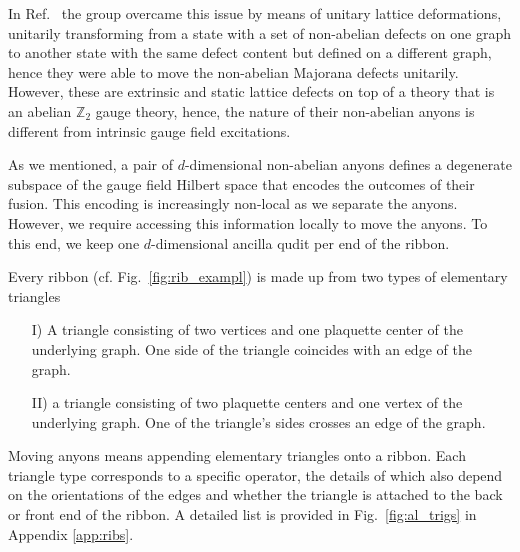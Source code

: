 \documentclass[a4paper,twocolumn,11pt, accepted=2024-06-14]{quantumarticle}
\begin{document}
In Ref.~\cite{andersen2022observation} the group overcame this issue by means of unitary lattice deformations, unitarily transforming from a state with a set of non-abelian defects on one graph to another state with the same defect content but defined on a different graph, hence they were able to move the non-abelian Majorana defects unitarily. However, these are extrinsic and static lattice defects on top of a theory that is an abelian $\mathbb Z_2$ gauge theory, hence, the nature of their non-abelian anyons is different from intrinsic gauge field excitations.

As we mentioned, a pair of $d$-dimensional non-abelian anyons defines a degenerate subspace of the gauge field Hilbert space that encodes the outcomes of their fusion. This encoding is increasingly non-local as we separate the anyons. However, we require accessing this information locally to move the anyons. To this end, we keep one $d$-dimensional ancilla qudit per end of the ribbon.

Every ribbon (cf. Fig.~\ref{fig:rib_exampl}) is made up from two types of elementary triangles
\begin{itemize}
    \item[I)] A triangle consisting of two vertices and one plaquette center of the underlying graph. One side of the triangle coincides with an edge of the graph.
        \item[II)] a triangle consisting of two plaquette centers and one vertex of the underlying graph. One of the triangle's sides crosses an edge of the graph.
\end{itemize}
Moving anyons means appending elementary triangles onto a ribbon. Each triangle type corresponds to a specific operator, the details of which also depend on the orientations of the edges and whether the triangle is attached to the back or front end of the ribbon. A detailed list is provided in Fig.~\ref{fig:al_trigs} in Appendix \ref{app:ribs}.
\end{document}
